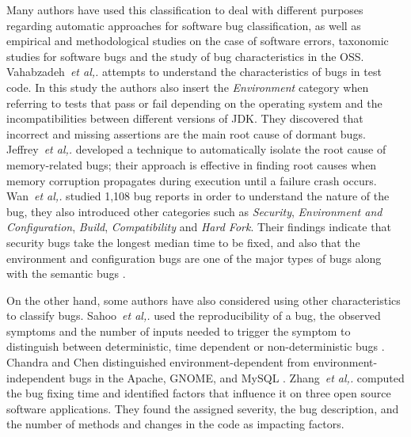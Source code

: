 \documentclass[a4paper, 12pt]{book}
\begin{document}
Many authors have used this classification to deal with different purposes regarding automatic approaches for software bug classification, as well as empirical and methodological studies on the case of software errors, taxonomic studies for software bugs and the study of bug characteristics in the OSS. Vahabzadeh~\emph{et al,.} attempts to understand the characteristics of bugs in test code. In this study the authors also insert  the \emph{Environment} category when referring to tests that pass or fail depending on the operating system and the incompatibilities between different versions of JDK. They discovered that incorrect and missing assertions are the main root cause of dormant bugs\cite{vahabzadeh2015empirical}. Jeffrey~\emph{et al,.} developed a technique to automatically isolate the root cause of memory-related bugs; their approach is effective in finding root causes when memory corruption propagates during execution until a failure crash occurs\cite{jeffrey2008identifying}. Wan~\emph{et al,.} studied 1,108 bug reports in order to understand the nature of the bug, they also introduced other categories such as \emph{Security}, \emph{Environment and Configuration}, \emph{Build}, \emph{Compatibility} and \emph{Hard Fork}. Their findings indicate that security bugs take the longest median time to be fixed, and also that the environment and configuration bugs are one of the major types of bugs along with the semantic bugs \cite{wan2017bug}. 

On the other hand, some authors have also considered using other characteristics to classify bugs. Sahoo~\emph{et al,.} used the reproducibility of a bug, the observed symptoms and the number of inputs needed to trigger the symptom to distinguish between deterministic, time dependent or non-deterministic bugs \cite{sahoo2010empirical}. Chandra and Chen distinguished environment-dependent  from environment-independent bugs in the Apache, GNOME, and MySQL \cite{chandra2000whither}. Zhang~\emph{et al,.} computed the bug fixing time and identified factors that influence it on three open source software applications. They found the assigned severity, the bug description, and the number of methods and changes in the code as impacting factors.

\end{document}

